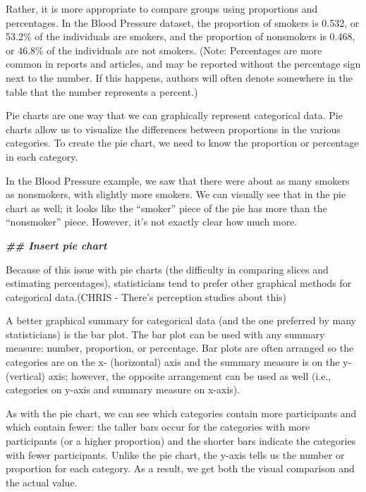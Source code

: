 \documentclass[
]{book}
\newenvironment{Shaded}{\begin{snugshade}}{\end{snugshade}}
\newcommand{\DocumentationTok}[1]{\textcolor[rgb]{0.56,0.35,0.01}{\textbf{\textit{#1}}}}
\begin{document}
Rather, it is more appropriate to compare groups using proportions and percentages. In the Blood Pressure dataset, the proportion of smokers is 0.532, or 53.2\% of the individuals are smokers, and the proportion of nonsmokers is 0.468, or 46.8\% of the individuals are not smokers. (Note: Percentages are more common in reports and articles, and may be reported without the percentage sign next to the number. If this happens, authors will often denote somewhere in the table that the number represents a percent.)

Pie charts are one way that we can graphically represent categorical data. Pie charts allow us to visualize the differences between proportions in the various categories. To create the pie chart, we need to know the proportion or percentage in each category.

In the Blood Pressure example, we saw that there were about as many smokers as nonsmokers, with slightly more smokers. We can visually see that in the pie chart as well; it looks like the ``smoker'' piece of the pie has more than the ``nonsmoker'' piece. However, it's not exactly clear how much more.

\begin{Shaded}
\begin{Highlighting}[]
\DocumentationTok{\#\# Insert pie chart}
\end{Highlighting}
\end{Shaded}

Because of this issue with pie charts (the difficulty in comparing slices and estimating percentages), statisticians tend to prefer other graphical methods for categorical data.(CHRIS - There's perception studies about this)

A better graphical summary for categorical data (and the one preferred by many statisticians) is the bar plot. The bar plot can be used with any summary measure: number, proportion, or percentage. Bar plots are often arranged so the categories are on the x- (horizontal) axis and the summary measure is on the y- (vertical) axis; however, the opposite arrangement can be used as well (i.e., categories on y-axis and summary measure on x-axis).

As with the pie chart, we can see which categories contain more participants and which contain fewer: the taller bars occur for the categories with more participants (or a higher proportion) and the shorter bars indicate the categories with fewer participants. Unlike the pie chart, the y-axis tells us the number or proportion for each category. As a result, we get both the visual comparison and the actual value.
\end{document}
